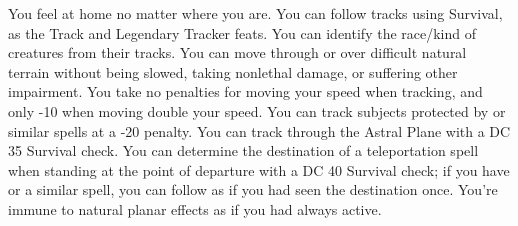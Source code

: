 {You feel at home no matter where you are.}
{You can follow tracks using Survival, as the Track and Legendary Tracker feats.}
{You can identify the race/kind of creatures from their tracks.}
{You can move through or over difficult natural terrain without being slowed, taking nonlethal damage, or suffering other impairment. You take no penalties for moving your speed when tracking, and only -10 when moving double your speed. You can track subjects protected by  or similar spells at a -20 penalty.}
{You can track through the Astral Plane with a DC 35 Survival check. You can determine the destination of a teleportation spell when standing at the point of departure with a DC 40 Survival check; if you have  or a similar spell, you can follow as if you had seen the destination once.}
{You're immune to natural planar effects as if you had  always active.}